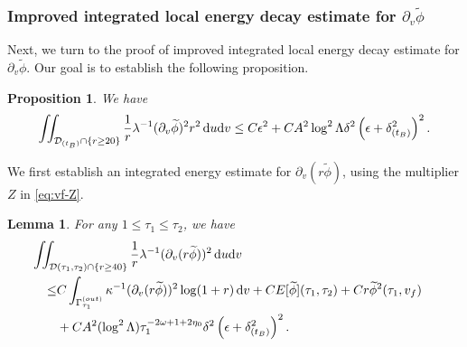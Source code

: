 \documentclass[10pt, reqno]{amsart}
\newtheorem{lemma}[theorem]{Lemma}
\newtheorem{proposition}[theorem]{Proposition}
\theoremstyle{definition}
\theoremstyle{remark}
\theoremstyle{conjecture}
\numberwithin{equation}{section}
\newcommand{\set}[1]{\{#1\}}
\newcommand{\ud}{\mathrm{d}}
\newcommand{\rd}{\partial}
\newcommand{\0}{\emptyset}
\newcommand{\Gmm}{\Gamma}
\newcommand{\dlt}{\delta}
\newcommand{\eps}{\epsilon}
\newcommand{\kpp}{\kappa}
\newcommand{\lmb}{\lambda}
\newcommand{\Lmb}{\Lambda}
\newcommand{\omg}{\omega}
\newcommand{\calD}{\mathcal D}
\newcommand{\dvr}{\lmb}
\newcommand{\phibg}{\overline{\phi}}				%
\newcommand{\phidf}{\widetilde{\phi}}				%
\begin{document}
\subsubsection*{Improved integrated local energy decay estimate for $\rd_{v} \phidf$}
Next, we turn to the proof of improved integrated local energy decay estimate for $\rd_{v} \phidf$. Our goal is to establish the following proposition.
\begin{proposition} \label{prop:en-dvphi-goal}
We have
\begin{equation} \label{eq:en-dvphi-goal}
	\iint_{\calD_{(t_B)} \cap \set{r \geq 20}} \frac{1}{r} \dvr^{-1}(\rd_{v} \phidf)^{2} r^{2} \, \ud u \ud v  \\
	\leq C \eps^{2}
	+ C A^{2} \log^{2} \Lmb \dlt^{2} \left( \eps + \dlt_{(t_{B})}^{2} \right)^{2} .
\end{equation}
\end{proposition}

We first establish an integrated energy estimate for $\rd_{v} (r \phidf)$, using the multiplier $Z$ in \eqref{eq:vf-Z}.
\begin{lemma} \label{lem:en-dvrphi}
For any $1 \leq \tau_{1} \leq \tau_{2}$, we have
\begin{equation}
\begin{aligned}
& \hskip-2em
	\iint_{\calD(\tau_{1}, \tau_{2}) \cap \set{r \geq 40}} \frac{1}{r} \dvr^{-1} (\rd_{v} (r \phidf))^{2} \, \ud u \ud v \\
	\leq & C  \int_{\Gmm^{(out)}_{\tau_{1}}} \kpp^{-1} (\rd_{v} (r \phidf))^{2} \log(1 + r) \, \ud v 
		+ C E[\phidf](\tau_{1}, \tau_{2}) + C r \phidf^{2}(\tau_{1}, v_{f}) \\
		& + C A^{2} (\log^{2} \Lmb) \tau_{1}^{-2 \omg + 1 + 2 \eta_{0}} \dlt^{2} \left( \eps + \dlt_{(t_{B})}^{2} \right)^{2} .
\end{aligned}
\end{equation}
\end{lemma}
\end{document}
